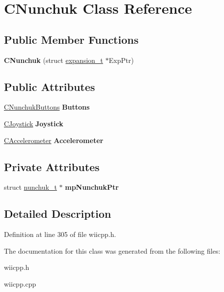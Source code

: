 \hypertarget{class_c_nunchuk}{\section{C\-Nunchuk Class Reference}
\label{class_c_nunchuk}
}
\subsection*{Public Member Functions}
\begin{DoxyCompactItemize}
\item 
\hypertarget{class_c_nunchuk_a6f4eaa8c718137b80c31bd845949eea4}{{\bfseries C\-Nunchuk} (struct \hyperlink{structexpansion__t}{expansion\-\_\-t} $\ast$Exp\-Ptr)}\label{class_c_nunchuk_a6f4eaa8c718137b80c31bd845949eea4}

\end{DoxyCompactItemize}
\subsection*{Public Attributes}
\begin{DoxyCompactItemize}
\item 
\hypertarget{class_c_nunchuk_a781de564cb6f35c885534c8f3878adf0}{\hyperlink{class_c_nunchuk_buttons}{C\-Nunchuk\-Buttons} {\bfseries Buttons}}\label{class_c_nunchuk_a781de564cb6f35c885534c8f3878adf0}

\item 
\hypertarget{class_c_nunchuk_a06c368af6b3dcef2b8b5619a4f02d5fb}{\hyperlink{class_c_joystick}{C\-Joystick} {\bfseries Joystick}}\label{class_c_nunchuk_a06c368af6b3dcef2b8b5619a4f02d5fb}

\item 
\hypertarget{class_c_nunchuk_a7644bb8821e484b421e49488bb10052d}{\hyperlink{class_c_accelerometer}{C\-Accelerometer} {\bfseries Accelerometer}}\label{class_c_nunchuk_a7644bb8821e484b421e49488bb10052d}

\end{DoxyCompactItemize}
\subsection*{Private Attributes}
\begin{DoxyCompactItemize}
\item 
\hypertarget{class_c_nunchuk_a7251cf7f531742379af0efc1fef05c92}{struct \hyperlink{structnunchuk__t}{nunchuk\-\_\-t} $\ast$ {\bfseries mp\-Nunchuk\-Ptr}}\label{class_c_nunchuk_a7251cf7f531742379af0efc1fef05c92}

\end{DoxyCompactItemize}


\subsection{Detailed Description}


Definition at line 305 of file wiicpp.\-h.



The documentation for this class was generated from the following files\-:\begin{DoxyCompactItemize}
\item 
wiicpp.\-h\item 
wiicpp.\-cpp\end{DoxyCompactItemize}
